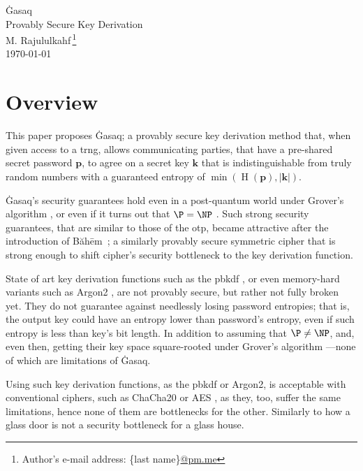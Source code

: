\documentclass[twocolumn,hidelinks]{article}
\newcommand{\ghasaq}{Ġasaq}
\newcommand{\baheem}{Băhēm}
\DeclareMathOperator{\entropy}{H}
\begin{document}
\begin{center}
    \Huge
    \ghasaq\\
    \Large
    Provably Secure Key Derivation\\
    \normalsize
    \vspace{0.5em}
    M. Rajululkahf\,\footnote{Author's
    e-mail address: \{last name\}\url{@pm.me}}\\
    \vspace{0.5em}
    \footnotesize
    \today\\
\end{center}

\section*{Overview}
This paper proposes \ghasaq; a provably secure key derivation method that,
when given access to a \gls{trng}, allows communicating parties, that have
a pre-shared secret password $\mathbf{p}$, to agree on a secret key
$\mathbf{k}$ that is indistinguishable from truly random numbers with a
guaranteed entropy of $\min(\entropy(\mathbf{p}), |\mathbf{k}|)$.

\ghasaq's security guarantees hold even in a post-quantum world under
Grover's algorithm \cite{10.1145/237814.237866}, or even if it turns out
that $\P = \NP$ \cite{10.1145/800157.805047}. Such strong security
guarantees, that are similar to those of the \gls{otp}, became attractive
after the introduction of \baheem\ \cite{baheem}; a similarly provably
secure symmetric cipher that is strong enough to shift cipher's security
bottleneck to the key derivation function.

State of art key derivation functions such as the \gls{pbkdf}
\cite{rfc8018}, or even memory-hard variants such as Argon2 \cite{argon2},
are not provably secure, but rather not fully broken yet.  They do not
guarantee against needlessly losing password entropies; that is, the output
key could have an entropy lower than password's entropy, even if such
entropy is less than key's bit length. In addition to assuming that $\P \ne
\NP$, and, even then, getting their key space square-rooted under Grover's
algorithm ---none of which are limitations of \ghasaq.

Using such key derivation functions, as the \gls{pbkdf} or Argon2, is
acceptable with conventional ciphers, such as ChaCha20 \cite{chacha20} or
AES \cite{aes}, as they, too, suffer the same limitations, hence none of
them are bottlenecks for the other.  Similarly to how a glass door is not a
security bottleneck for a glass house.
\end{document}
